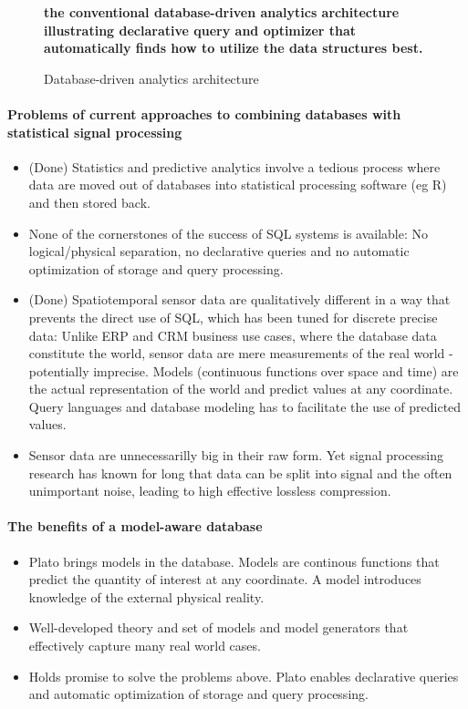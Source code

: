 \begin{figure}
{\bf the conventional database-driven analytics architecture illustrating declarative query and optimizer that automatically finds how to utilize the data structures best.}
\caption{Database-driven analytics architecture}
\label{fig:db-driven-arch}
\end{figure}


\paragraph{Problems of current approaches to combining databases with statistical signal processing}
\begin{itemize}
\item (Done) Statistics and predictive analytics involve a tedious process where data are moved out of databases into statistical processing software (eg R) and then stored back.
%
\item None of the cornerstones of the success of SQL systems is available: No logical/physical separation, no declarative queries and no automatic optimization of storage and query processing.
%
\item (Done) Spatiotemporal sensor data are qualitatively different in a way that prevents the direct use of SQL, which has been tuned for discrete precise data: Unlike ERP and CRM business use cases, where the database data constitute the world, sensor data are mere measurements of the real world - potentially imprecise. Models (continuous functions over space and time) are the actual representation of the world and predict values at any coordinate. Query languages and database modeling has to facilitate the use of predicted values.
%
\item Sensor data are unnecessarilly big in their raw form. Yet signal processing research has known for long that data can be split into signal and the often unimportant noise, leading to high effective lossless compression. 
%
\end{itemize}

\paragraph{The benefits of a model-aware database}

\begin{itemize}
%
\item Plato brings models in the database. Models are continous functions that predict the quantity of interest at any coordinate. A model introduces knowledge of the external physical reality.
%
\item Well-developed theory and set of models and model generators that effectively capture many real world cases.
%
\item Holds promise to solve the problems above. Plato enables declarative queries and automatic optimization of storage and query processing.
%
\end{itemize}

